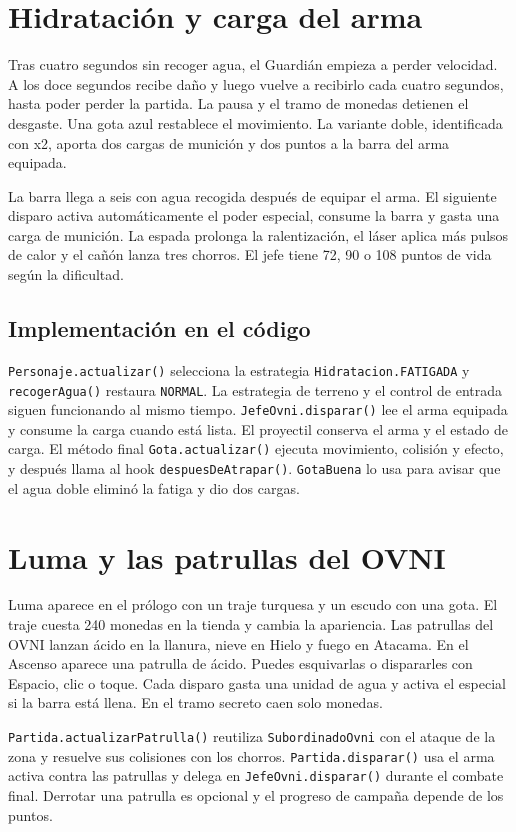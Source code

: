 \section{Hidratación y carga del arma}
Tras cuatro segundos sin recoger agua, el Guardián empieza a perder velocidad. A los doce segundos recibe daño y luego vuelve a recibirlo cada cuatro segundos, hasta poder perder la partida. La pausa y el tramo de monedas detienen el desgaste. Una gota azul restablece el movimiento. La variante doble, identificada con x2, aporta dos cargas de munición y dos puntos a la barra del arma equipada.

La barra llega a seis con agua recogida después de equipar el arma. El siguiente disparo activa automáticamente el poder especial, consume la barra y gasta una carga de munición. La espada prolonga la ralentización, el láser aplica más pulsos de calor y el cañón lanza tres chorros. El jefe tiene 72, 90 o 108 puntos de vida según la dificultad.

\subsection{Implementación en el código}
\texttt{Personaje.actualizar()} selecciona la estrategia \texttt{Hidratacion.FATIGADA} y \texttt{recogerAgua()} restaura \texttt{NORMAL}. La estrategia de terreno y el control de entrada siguen funcionando al mismo tiempo. \texttt{JefeOvni.disparar()} lee el arma equipada y consume la carga cuando está lista. El proyectil conserva el arma y el estado de carga. El método final \texttt{Gota.actualizar()} ejecuta movimiento, colisión y efecto, y después llama al hook \texttt{despuesDeAtrapar()}. \texttt{GotaBuena} lo usa para avisar que el agua doble eliminó la fatiga y dio dos cargas.


\section{Luma y las patrullas del OVNI}
Luma aparece en el prólogo con un traje turquesa y un escudo con una gota. El traje cuesta 240 monedas en la tienda y cambia la apariencia. Las patrullas del OVNI lanzan ácido en la llanura, nieve en Hielo y fuego en Atacama. En el Ascenso aparece una patrulla de ácido. Puedes esquivarlas o dispararles con Espacio, clic o toque. Cada disparo gasta una unidad de agua y activa el especial si la barra está llena. En el tramo secreto caen solo monedas.

\texttt{Partida.actualizarPatrulla()} reutiliza \texttt{SubordinadoOvni} con el ataque de la zona y resuelve sus colisiones con los chorros. \texttt{Partida.disparar()} usa el arma activa contra las patrullas y delega en \texttt{JefeOvni.disparar()} durante el combate final. Derrotar una patrulla es opcional y el progreso de campaña depende de los puntos.
